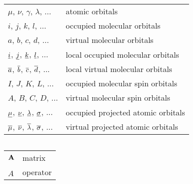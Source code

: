 \documentclass[a4paper,12pt]{report}
\begin{document}
\newpage


{
\setlength{\tabcolsep}{14pt}
\renewcommand{\arraystretch}{1.5}
\begin{longtable}[l]{ll}
$\mu$, $\nu$, $\gamma$, $\lambda$, ... & atomic orbitals \\
$i$, $j$, $k$, $l$, ... & occupied molecular orbitals \\
$a$, $b$, $c$, $d$, ... & virtual molecular orbitals \\
$\underline{i}$, $\underline{j}$, $\underline{k}$, $\underline{l}$, ... & local occupied molecular orbitals \\
$\overline{a}$, $\overline{b}$, $\overline{c}$, $\overline{d}$, ... & local virtual molecular orbitals \\
$I$, $J$, $K$, $L$, ... & occupied molecular spin orbitals \\
$A$, $B$, $C$, $D$, ... & virtual molecular spin orbitals \\
$\underline{\mu}$, $\underline{\nu}$, $\underline{\lambda}$, $\underline{\sigma}$, ... & occupied projected atomic orbitals \\
$\overline{\mu}$, $\overline{\nu}$, $\overline{\lambda}$, $\overline{\sigma}$, ... & virtual projected atomic orbitals
\end{longtable}
}

\vspace{0.5cm}

{
\setlength{\tabcolsep}{14pt}
\renewcommand{\arraystretch}{1.5}
\begin{longtable}[l]{ll}

\end{longtable}
}


{
\setlength{\tabcolsep}{14pt}
\renewcommand{\arraystretch}{1.5}
\begin{longtable}[l]{ll}
$\mathbf{A}$ & matrix \\
$\hat{A}$ & operator \\
\end{longtable}
}

\newpage



\setcounter{tocdepth}{2}
\tableofcontents

\newpage

\listoffigures

\newpage

\listoftables

\newpage
\end{document}
